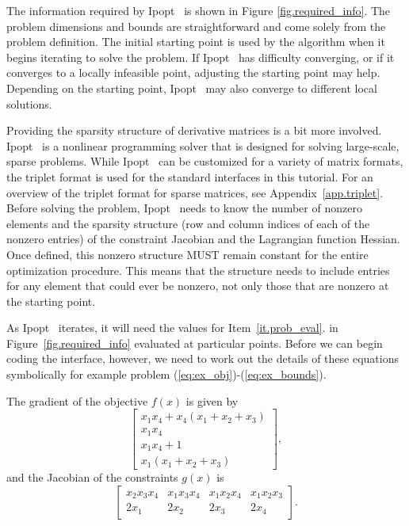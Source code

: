 \documentclass[10pt]{article}
\newcommand{\Ipopt}{{\sc Ipopt }}
\begin{document}
The information required by \Ipopt\ is shown in Figure
\ref{fig.required_info}. The problem dimensions and bounds are
straightforward and come solely from the problem definition. The
initial starting point is used by the algorithm when it begins
iterating to solve the problem. If \Ipopt\ has difficulty converging, or
if it converges to a locally infeasible point, adjusting the starting
point may help.  Depending on the starting point, \Ipopt\ may also
converge to different local solutions.

Providing the sparsity structure of derivative matrices is a bit more
involved. \Ipopt\ is a nonlinear programming solver that is designed
for solving large-scale, sparse problems. While \Ipopt\ can be
customized for a variety of matrix formats, the triplet format is used
for the standard interfaces in this tutorial. For an overview of the
triplet format for sparse matrices, see Appendix~\ref{app.triplet}.
Before solving the problem, \Ipopt\ needs to know the number of
nonzero elements and the sparsity structure (row and column indices of
each of the nonzero entries) of the constraint Jacobian and the
Lagrangian function Hessian. Once defined, this nonzero structure MUST
remain constant for the entire optimization procedure. This means that
the structure needs to include entries for any element that could ever
be nonzero, not only those that are nonzero at the starting point.

As \Ipopt\ iterates, it will need the values for
Item~\ref{it.prob_eval}. in Figure~\ref{fig.required_info} evaluated at
particular points. Before we can begin coding the interface, however,
we need to work out the details of these equations symbolically for
example problem (\ref{eq:ex_obj})-(\ref{eq:ex_bounds}).

The gradient of the objective $f(x)$ is given by
\[%
\left[
\begin{array}{c}
x_1 x_4 + x_4 (x_1 + x_2 + x_3) \\
x_1 x_4 \\
x_1 x_4 + 1 \\
x_1 (x_1 + x_2 + x_3)
\end{array}
\right],
\]%
and the Jacobian of the constraints $g(x)$ is
\[%
\left[
\begin{array}{cccc}
x_2 x_3 x_4     & x_1 x_3 x_4   & x_1 x_2 x_4   & x_1 x_2 x_3   \\
2 x_1           & 2 x_2         & 2 x_3         & 2 x_4
\end{array}
\right].
\]%
\end{document}
